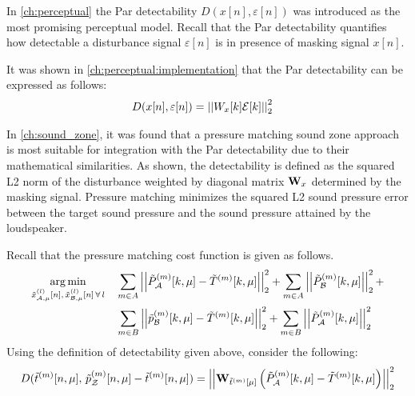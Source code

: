 In \autoref{ch:perceptual} the Par detectability $D(x[n],\varepsilon[n])$ was introduced as the most promising perceptual model.
Recall that the Par detectability quantifies how detectable a disturbance signal $\varepsilon[n]$ is in presence of masking signal $x[n]$.

It was shown in \autoref{ch:perceptual:implementation} that the Par detectability can be expressed as follows: 
\begin{align}
    D(x[n],\varepsilon[n]) &= \norm[2][2]{W_{x}[k]\mathcal{E}[k]} 
\end{align}

In \autoref{ch:sound_zone}, it was found that a pressure matching sound zone approach is most suitable for integration with the Par detectability
due to their mathematical similarities.
As shown, the detectability is defined as the squared L2 norm of the disturbance weighted by diagonal matrix $\mathbf{W}_{x}$ determined by the masking signal.
Pressure matching minimizes the squared L2 sound pressure error between the target sound pressure and the sound pressure attained by the loudspeaker.

Recall that the pressure matching cost function is given as follows.
\begin{align}
    \argmin{\tilde{x}_{\za,\mu}^{(l)}[n],\,\tilde{x}_{\zb,\mu}^{(l)}[n]\,\forall\,l}{
       &\sum_{m\in A} \norm[2][2]{\tilde{P}_{\za}^{(m)}[k,\mu] - \tilde{T}^{(m)}[k,\mu]} +
        \sum_{m\in A} \norm[2][2]{\tilde{P}_{\zb}^{(m)}[k,\mu]} + \\
       &\sum_{m\in B} \norm[2][2]{\tilde{p}_{\zb}^{(m)}[k,\mu] - \tilde{T}^{(m)}[k,\mu]} + 
        \sum_{m\in B} \norm[2][2]{\tilde{P}_{\za}^{(m)}[k,\mu]}
    }
\end{align}
Using the definition of detectability given above, consider the following:
\begin{equation}
    D(\tilde{t}^{(m)}[n,\mu],\,\tilde{p}_{\zz}^{(m)}[n,\mu] - \tilde{t}^{(m)}[n,\mu]) = 
        \norm[2][2]{\mat{W}_{\tilde{t}^{(m)}[\mu]}\left(\tilde{P}_{\za}^{(m)}[k,\mu] - \tilde{T}^{(m)}[k,\mu]\right)} 
\end{equation}

